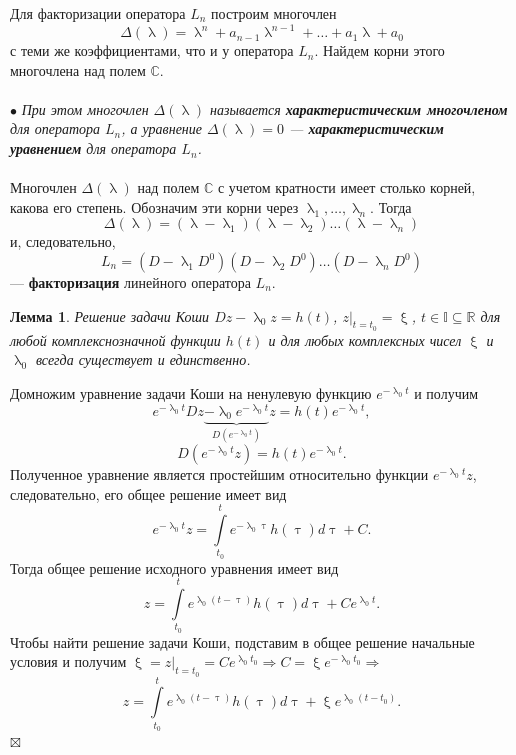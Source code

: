 \documentclass[a4paper, 12pt]{report}
\newenvironment{Proof} %
{\par\noindent{$\blacklozenge$}} %
{\hfill$\scriptstyle\boxtimes$}
\renewcommand{\lambda}{\uplambda}
\renewcommand{\xi}{\upxi}
\begin{document}
	Для факторизации оператора $L_n$ построим многочлен $$\Delta(\lambda) = \lambda^n+a_{n-1}\lambda^{n-1} + \ldots + a_1\lambda + a_0$$ с теми же коэффициентами, что и у оператора $L_n$. Найдем корни этого многочлена над полем $\mathbb{C}$.\\\\
	$\bullet$ \textit{При этом многочлен $\Delta(\lambda)$ называется \textbf{характеристическим многочленом} для оператора $L_n$, а уравнение $\Delta(\lambda) = 0$ --- \textbf{характеристическим уравнением} для оператора $L_n$.}\\\\
	Многочлен $\Delta(\lambda)$ над полем $\mathbb{C}$ с учетом кратности имеет столько корней, какова его степень. Обозначим эти корни через $\lambda_1,\ldots, \lambda_n$. Тогда $$\Delta(\lambda) = (\lambda - \lambda_1)(\lambda-\lambda_2)\ldots(\lambda - \lambda_n)$$ и, следовательно, $$L_n = (D-\lambda_1D^0)(D-\lambda_2D^0)\ldots(D-\lambda_nD^0)$$ --- \textbf{факторизация} линейного оператора $L_n$.
	\newtheorem*{2_1_1}{Лемма}\begin{2_1_1}Решение задачи Коши $Dz - \lambda_0z = h(t)$, $z|_{t=t_0} = \xi$, $t\in\mathbb{I}\subseteq\mathbb{R}$ для любой комплекснозначной функции $h(t)$ и для любых комплексных чисел $\xi$ и $\lambda_0$ всегда существует и единственно.
	\end{2_1_1}\begin{Proof}
		Домножим уравнение задачи Коши на ненулевую функцию $e^{-\lambda_0t}$ и получим $$e^{-\lambda_0t}Dz \underbrace{ - \lambda_0 e^{-\lambda_0t}}_{D(e^{-\lambda_0t})}z = h(t) e^{-\lambda_0t},$$
		$$D(e^{-\lambda_0t}z)=h(t)e^{-\lambda_0t}.$$ Полученное уравнение является простейшим относительно функции $e^{-\lambda_0t}z$, следовательно, его общее решение имеет вид $$e^{-\lambda_0t}z = \int\limits_{t_0}^te^{-\lambda_0\uptau}h(\uptau)d\uptau + C.$$ Тогда общее решение исходного уравнения имеет вид $$z = \int\limits_{t_0}^te^{\lambda_0(t-\uptau)}h(\uptau)d\uptau + Ce^{\lambda_0t}.$$ Чтобы найти решение задачи Коши, подставим в общее решение начальные условия и получим $\xi = z|_{t=t_0} = Ce^{\lambda_0t_0}\Rightarrow C = \xi e^{-\lambda_0t_0}\Rightarrow$ $$z = \int\limits_{t_0}^te^{\lambda_0(t-\uptau)}h(\uptau)d\uptau + \xi e^{\lambda_0(t-t_0)}.$$
	\end{Proof}
\end{document}
